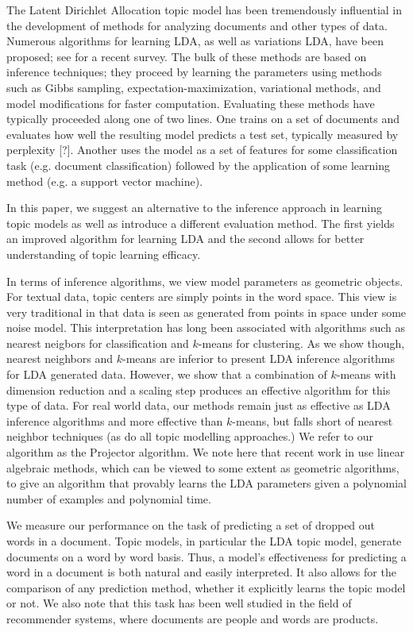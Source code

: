 
The Latent Dirichlet Allocation topic model has been tremendously
influential in the development of methods for analyzing documents and
other types of data.  Numerous algorithms for learning LDA, as
well as variations LDA, have been proposed; see \cite{BleiCACM} for
a recent survey.  The bulk of these methods
are based on inference techniques; they proceed by
learning the parameters using methods such as Gibbs sampling,
expectation-maximization, variational methods, and model modifications for faster
computation.  Evaluating these methods have typically proceeded
along one of two lines. One trains on a set of documents and evaluates
how well the resulting model predicts a test set, typically measured by
perplexity [?].  Another uses the model as a set of features for some
classification task (e.g. document classification) followed by the application of
some learning method (e.g. a support vector machine).

In this paper, we suggest an alternative to the inference approach in
learning topic models as well as introduce a different evaluation method. The
first yields an improved algorithm for learning LDA and the second
allows for better understanding of topic learning efficacy.

In terms of inference algorithms, we view model parameters as geometric objects.
For textual data, topic centers are simply points in the word space. This view
is very traditional in that data is seen as generated from points in space under
some noise model. This interpretation has long been associated with algorithms
such as nearest neigbors for classification and $k$-means for clustering. As we show
though, nearest neighbors and $k$-means are inferior to
present LDA inference algorithms for LDA generated data.  However, we show that
a combination of $k$-means with dimension reduction and a
scaling step produces an effective algorithm for this type of data.
For real world data, our methods remain just as effective as LDA inference algorithms
and more effective than $k$-means, but falls short of nearest neighbor
techniques (as do all topic modelling approaches.) We refer to
our algorithm as the Projector algorithm.  We note here that recent
work in \cite{AnandLDA} use linear algebraic methods, which can be
viewed to some extent as geometric algorithms, to give an algorithm
that provably learns the LDA parameters given a polynomial
number of examples and polynomial time.

We measure our performance on the task of predicting a set of dropped out
words in a document.  Topic models, in particular the LDA topic model,
generate documents on a word by word basis.  Thus, a model's effectiveness
for predicting a word in a document is both natural and easily interpreted. It also
allows for the comparison of any prediction method, whether it explicitly learns
the topic model or not.  We also note that this task has been well studied
in the field of recommender systems, where documents are people and words are products.



